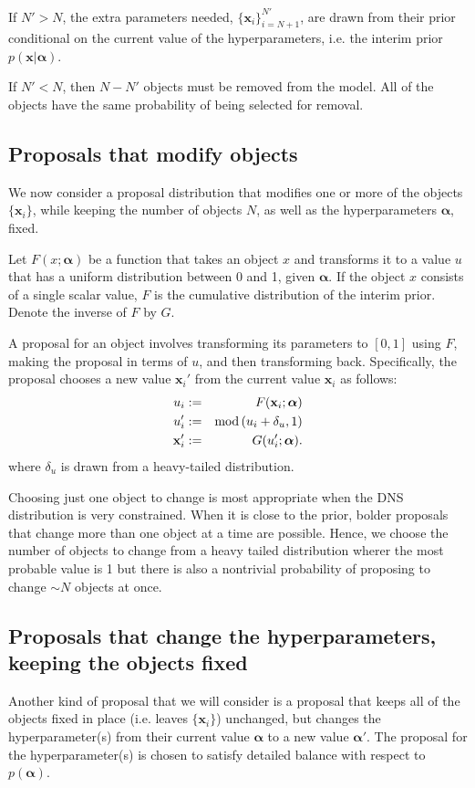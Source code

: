 \documentclass[letterpaper, 11pt]{article}
\newcommand{\hyperparams}{\boldsymbol{\alpha}}
\newcommand{\xx}{\mathbf{x}}
\begin{document}
If $N' > N$, the extra parameters needed, $\{\xx_i\}_{i=N+1}^{N'}$,
are drawn from their prior conditional on the current value of the
hyperparameters, i.e. the interim prior $p(\xx | \hyperparams)$.

If $N' < N$, then $N - N'$ objects must be removed from the model. All
of the objects have the same probability of being selected for removal.

\subsection{Proposals that modify objects}\label{sec:proposal2}
We now consider a proposal distribution that modifies one or more of the
objects $\{\xx_i\}$, while keeping the number of objects $N$, as well as the
hyperparameters $\hyperparams$, fixed.

Let $F(x; \hyperparams)$ be a function that takes an object $x$ and transforms it
to a value $u$ that has a uniform distribution between 0 and 1, given $\hyperparams$.
If the object $x$ consists of a single scalar value, $F$ is the cumulative
distribution of the interim prior. Denote the inverse of $F$ by $G$.

A proposal
for an object involves transforming its parameters to $[0, 1]$ using $F$,
making the proposal in terms of $u$, and then transforming back.
Specifically, the proposal chooses
a new value $\xx_i'$ from the current value $\xx_i$ as follows:
\begin{eqnarray}
u_i &:=& F(\xx_i; \hyperparams)\\
u_i' &:=& \textnormal{mod}\left(u_i + \delta_u, 1\right)\\
\xx_i' &:=& G(u_i'; \hyperparams).
\end{eqnarray}
where $\delta_u$ is drawn from a heavy-tailed distribution.

Choosing just one object to change is most appropriate when the DNS
distribution is very constrained. When it is close to the prior, bolder
proposals that change more than one object at a time are possible. Hence,
we choose the number of objects to change from a heavy tailed distribution
wherer the most probable value is 1 but there is also a nontrivial probability
of proposing to change $\sim N$ objects at once.

\subsection{Proposals that change the hyperparameters,
keeping the objects fixed}\label{sec:proposal3}
Another kind of proposal that we will consider is a proposal that keeps all of
the objects fixed in place (i.e. leaves $\{\xx_i\}$) unchanged, but changes
the hyperparameter(s) from their current value $\hyperparams$
to a new value $\hyperparams'$. The proposal for the hyperparameter(s) is chosen
to satisfy detailed balance with respect to $p(\hyperparams)$.
\end{document}
